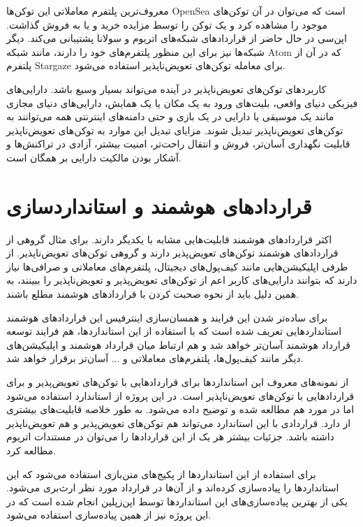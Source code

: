 معروف‌ترین پلتفرم معاملاتی این توکن‌ها
\gls{OpenSea}
است که می‌توان در آن توکن‌های موجود را مشاهده کرد و یک توکن را توسط مزایده خرید و یا به فروش گذاشت.
اپن‌سی در حال حاضر از قراردادهای شبکه‌های اتریوم و سولانا پشتیبانی می‌کند.
دیگر شبکه‌ها نیز برای این منظور پلتفرم‌های خود را دارند، مانند شبکه
\gls{Atom}
که در آن از پلتفرم
\gls{Stargaze}
برای معامله توکن‌های تعویض‌ناپذیر استفاده می‌شود.

کاربردهای توکن‌های تعویض‌ناپذیر در آینده می‌تواند بسیار وسیع باشد.
دارایی‌های فیزیکی دنیای واقعی، بلیت‌های ورود به یک مکان یا یک همایش،
دارایی‌های دنیای مجازی مانند یک موسیقی یا دارایی در یک بازی
و حتی دامنه‌های اینترنتی همه می‌توانند به توکن‌های تعویض‌ناپذیر تبدیل شوند.
مزایای تبدیل این موارد به توکن‌های تعویض‌ناپذیر قابلیت نگهداری آسان‌تر،
فروش و انتقال راحت‌تر، امنیت بیشتر، آزادی در تراکنش‌ها
و آشکار بودن مالکیت دارایی بر همگان است.


\section{قرارداد‌های هوشمند و استانداردسازی}
اکثر قرارداد‌های هوشمند قابلیت‌هایی مشابه با یکدیگر دارند.
برای مثال گروهی از قرارداد‌های هوشمند توکن‌های تعویض‌پذیر دارند
و گروهی توکن‌های تعویض‌ناپذیر.
از طرفی اپلیکیشن‌هایی مانند کیف‌پول‌های دیجیتال،
پلتفرم‌های معاملاتی و صرافی‌ها
نیاز دارند که بتوانند دارایی‌های کاربر
اعم از توکن‌های تعویض‌پذیر و تعویض‌ناپذیر را ببینند،
به همین دلیل باید از نحوه صحبت کردن با قراردادهای هوشمند مطلع باشند.

برای ساده‌تر شدن این فرایند
و همسان‌سازی اینترفیس این قراردادهای هوشمند استانداردهایی تعریف شده است
که با استفاده از این استانداردها، هم فرایند توسعه قرارداد هوشمند آسان‌تر خواهد شد
و هم ارتباط میان قرارداد هوشمند و اپلیکیشن‌های دیگر مانند کیف‌پول‌ها، پلتفرم‌های معاملاتی و ... آسان‌تر برقرار خواهد شد.

از نمونه‌های معروف این استانداردها
برای قرارداد‌هایی با توکن‌های تعویض‌پذیر و
برای قراردادهایی با توکن‌های تعویض‌ناپذیر است. در این پروژه از استاندارد
استفاده می‌شود اما در مورد
هم مطالعه شده و توضیح داده می‌شود.
به طور خلاصه
قابلیت‌های بیشتری از
دارد.
قراردادی با این استاندارد می‌تواند هم توکن‌های تعویض‌پذیر و هم تعویض‌ناپذیر داشته باشد.
جزئیات بیشتر هر یک از این قراردادها را می‌توان در مستندات اتریوم
\cite{EthereumDocs}
مطالعه کرد.

برای استفاده از این استاندارد‌ها از پکیج‌های متن‌بازی استفاده می‌شود که این استاندارد‌ها را پیاده‌سازی کرده‌اند
و از آن‌ها در قرارداد مورد نظر ارث‌بری می‌شود.
یکی از بهترین پیاده‌سازی‌های این استاندارد‌ها توسط اپن‌زپلین
\cite{ZeppelinDocs}
انجام شده است که در این پروژه نیز از همین پیاده‌سازی استفاده می‌شود.

